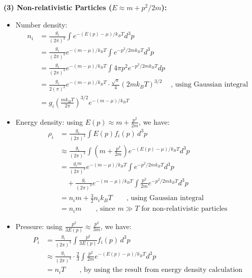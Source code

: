 \begin{foundation}
    \pagebreak
    \textbf{(3) Non-relativistic Particles ($E \approx m + p^2/2m$):}
     \begin{itemize}
        \item Number density:
        \begin{align*}
            n_i &= \frac{g_i}{(2\pi)^3} \int e^{-(E(p) - \mu)/k_B T} d^3p\\
                &= \frac{g_i}{(2\pi)^3} e^{-(m - \mu)/k_B T} \int e^{-p^2/2mk_B T} d^3p\\ 
                &= \frac{g_i}{(2\pi)^3} e^{-(m - \mu)/k_B T} \int 4 \pi p^2 e^{-p^2/2mk_B T} dp \\
                &= \frac{g_i}{2 (\pi)^2} e^{-(m - \mu)/k_B T} \cdot \frac{\sqrt{\pi}}{4}  (2mk_B T)^{3/2} & \text{, using Gaussian integral} \\
                &= g_i \left( \frac{m k_B T}{2\pi} \right)^{3/2} e^{-(m - \mu)/k_B T}
        \end{align*}
        \item Energy density: 
        using $E(p) \approx m + \frac{p^2}{2m}$, we have:
        \begin{align*}
            \rho_i &= \frac{g_i}{(2\pi)^3} \int E(p) f_i(p) \, d^3p \\
                    &\approx \frac{g_i}{(2\pi)^3} \int \left( m + \frac{p^2}{2m} \right) e^{-(E(p) - \mu)/k_B T} d^3p \\
                    &= \frac{g_i m}{(2\pi)^3} e^{-(m - \mu)/k_B T} \int e^{-p^2/2mk_B T} d^3p \\
                    & \quad + \frac{g_i}{(2\pi)^3} e^{-(m - \mu)/k_B T} \int \frac{p^2}{2m} e^{-p^2/2mk_B T} d^3p \\
                    &= n_i m + \frac{3}{2} n_i k_B T \qquad \text{, using Gaussian integral} \\
                    &= n_i m \qquad \text{, since $m \gg T$ for non-relativistic particles}
        \end{align*}
        \item Pressure: 
        using $\frac{p^2}{3E(p)} \approx \frac{p^2}{3m}$, we have:
        \begin{align*}
            P_i &= \frac{g_i}{(2\pi)^3} \int \frac{p^2}{3E(p)} f_i(p) \, d^3p \\
                &\approx \frac{g_i}{(2\pi)^3} \cdot \frac{2}{3} \int \frac{p^2}{2m} e^{-(E(p) - \mu)/k_B T} d^3p \\
                &= n_i T \qquad \text{, by using the result from energy density calculation}
        \end{align*}
     \end{itemize}
\end{foundation}

